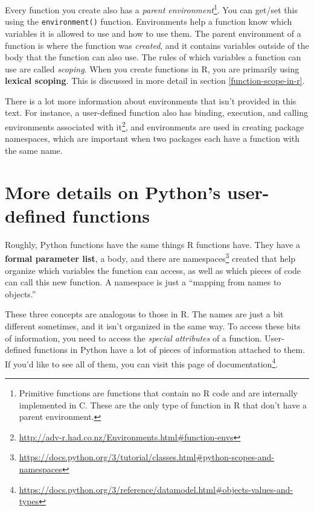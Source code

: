 \documentclass[12pt,krantz2]{krantz}
\renewcommand{\href}[2]{#2\footnote{\url{#1}}}
\begin{document}
Every function you create also has a \emph{parent environment}\footnote{Primitive functions are functions that contain no R code and are internally implemented in C. These are the only type of function in R that don't have a parent environment.}. You can get/set this using the \texttt{environment()} function. Environments help a function know which variables it is allowed to use and how to use them. The parent environment of a function is where the function was \emph{created}, and it contains variables outside of the body that the function can also use. The rules of which variables a function can use are called \emph{scoping}. When you create functions in R, you are primarily using \textbf{lexical scoping}. This is discussed in more detail in section \ref{function-scope-in-r}.

\begin{rmd-details}
There is a lot more information about environments that isn't provided in this text. For instance, a user-defined function also has \href{http://adv-r.had.co.nz/Environments.html\#function-envs}{binding, execution, and calling environments associated with it}, and environments are used in creating package namespaces, which are important when two packages each have a function with the same name.

\end{rmd-details}

\hypertarget{more-details-on-pythons-user-defined-functions}{%
\section{More details on Python's user-defined functions}\label{more-details-on-pythons-user-defined-functions}}

Roughly, Python functions have the same things R functions have. They have a \textbf{formal parameter list}, a body, and there are \href{https://docs.python.org/3/tutorial/classes.html\#python-scopes-and-namespaces}{namespaces} created that help organize which variables the function can access, as well as which pieces of code can call this new function. A namespace is just a ``mapping from names to objects.''

These three concepts are analogous to those in R. The names are just a bit different sometimes, and it isn't organized in the same way. To access these bits of information, you need to access the \emph{special attributes} of a function. User-defined functions in Python have a lot of pieces of information attached to them. If you'd like to see all of them, you can visit \href{https://docs.python.org/3/reference/datamodel.html\#objects-values-and-types}{this page of documentation}.
\end{document}
